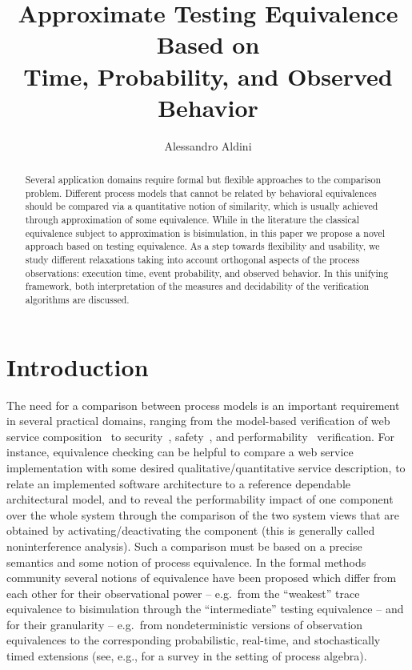 \documentclass[copyright,creativecommons]{eptcs}
\title{Approximate Testing Equivalence Based on \\ Time, Probability, and Observed Behavior}
\author{Alessandro Aldini
\institute{Dipartimento di Matematica, Fisica e Informatica -- University of Urbino, Italy}
\email{aldini@sti.uniurb.it}
}
\begin{document}
\maketitle

\begin{abstract}

Several application domains require formal but flexible approaches to the comparison problem.
Different process models that cannot be related by behavioral equivalences should be compared 
via a quantitative notion of similarity, which is usually achieved through approximation of 
some equivalence. While in the literature the classical equivalence subject to approximation 
is bisimulation, in this paper we propose a novel approach based on testing equivalence.
As a step towards flexibility and usability, we study different relaxations taking into account 
orthogonal aspects of the process observations: execution time, event probability, and observed 
behavior. In this unifying framework, both interpretation of the measures and decidability of 
the verification algorithms are discussed.

\end{abstract}

\section{Introduction}

The need for a comparison between process models is an important requirement in several practical domains, ranging 
from the model-based verification of web service composition~\cite{FUMK} to security~\cite{BPW}, safety~\cite{SWD}, 
and performability~\cite{AABBBL} verification. For instance, equivalence checking can be helpful to compare a web 
service implementation with some desired qualitative/quantitative service description, to relate an implemented 
software architecture to a reference dependable architectural model, and to reveal the performability impact of one 
component over the whole system through the comparison of the two system views that are obtained by 
activating/deactivating the component (this is generally called noninterference analysis). Such a comparison must 
be based on a precise semantics and some notion of process equivalence. 
In the formal methods community several notions of equivalence have been proposed which differ from each other for 
their observational power -- e.g.\ from the ``weakest'' trace equivalence to bisimulation through the 
``intermediate'' testing equivalence -- and for their granularity -- e.g.\ from nondeterministic versions of 
observation equivalences to the corresponding probabilistic, real-time, and stochastically timed extensions (see, 
e.g., \cite{HPA} for a survey in the setting of process algebra).
\end{document}
